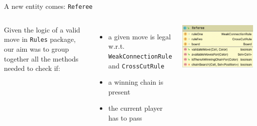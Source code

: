 \documentclass{beamer}
\begin{document}
\begin{frame}{A new entity comes: \texttt{Referee}}
 \begin{columns}
  Given the logic of a valid move in \texttt{Rules} package, our aim was to group together all the methods needed to check if:
  \vspace{0.4cm}
  \begin{itemize}
   \item a given move is legal w.r.t. \texttt{WeakConnectionRule} and \texttt{CrossCutRule}
   \vspace{0.25cm}
   \item a winning chain is present
   \vspace{0.25cm}
   \item the current player has to pass
  \end{itemize}
  
  
  \includegraphics[scale=0.27]{images/referee-class.png}
  
 \end{columns}
\end{frame}
\end{document}
